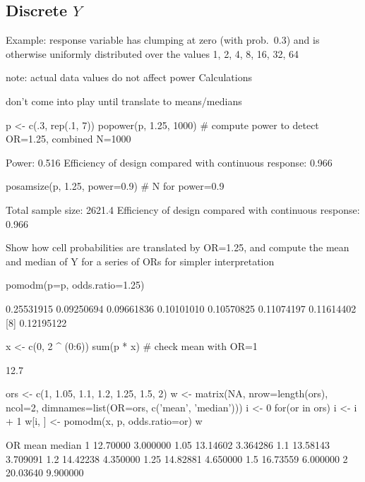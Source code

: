 \subsection{Discrete $Y$}
\bi
\item Example: response variable has clumping at zero (with prob.\ 0.3) and is otherwise uniformly distributed over the values 1, 2, 4, 8, 16, 32, 64
 \bi
 \item note: actual data values do not affect power Calculations
 \item don't come into play until translate to means/medians
 \ei
\begin{Schunk}
\begin{Sinput}
p <- c(.3, rep(.1, 7))
popower(p, 1.25, 1000)  # compute power to detect OR=1.25, combined N=1000
\end{Sinput}
\begin{Soutput}
Power: 0.516 
Efficiency of design compared with continuous response: 0.966 
\end{Soutput}
\begin{Sinput}
posamsize(p, 1.25, power=0.9)  # N for power=0.9
\end{Sinput}
\begin{Soutput}
Total sample size: 2621.4 
Efficiency of design compared with continuous response: 0.966 
\end{Soutput}
\end{Schunk}
\item Show how cell probabilities are translated by OR=1.25, and compute the mean and median of Y for a series of ORs for simpler interpretation
\begin{Schunk}
\begin{Sinput}
pomodm(p=p, odds.ratio=1.25)
\end{Sinput}
\begin{Soutput}
[1] 0.25531915 0.09250694 0.09661836 0.10101010 0.10570825 0.11074197 0.11614402
[8] 0.12195122
\end{Soutput}
\begin{Sinput}
x <- c(0, 2 ^ (0:6))
sum(p * x)  # check mean with OR=1
\end{Sinput}
\begin{Soutput}
[1] 12.7
\end{Soutput}
\begin{Sinput}
ors <- c(1, 1.05, 1.1, 1.2, 1.25, 1.5, 2)
w <- matrix(NA, nrow=length(ors), ncol=2, 
            dimnames=list(OR=ors, c('mean', 'median')))
i <- 0
for(or in ors) {
  i <- i + 1
  w[i, ] <- pomodm(x, p, odds.ratio=or)
}
w
\end{Sinput}
\begin{Soutput}
      
OR         mean   median
  1    12.70000 3.000000
  1.05 13.14602 3.364286
  1.1  13.58143 3.709091
  1.2  14.42238 4.350000
  1.25 14.82881 4.650000
  1.5  16.73559 6.000000
  2    20.03640 9.900000
\end{Soutput}
\end{Schunk}
\ei

